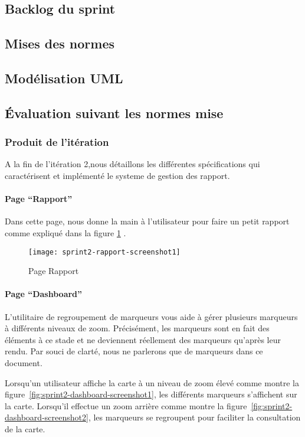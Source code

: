 \subsection{Backlog du sprint}
\subsection{Mises des normes}
\subsection{Modélisation UML}
\subsection{Évaluation suivant les normes mise}
\subsubsection{Produit de l'itération}
A la fin de l'itération 2,nous détaillons les différentes spécifications qui caractérisent et 
implémenté le systeme de gestion des rapport.
\paragraph{Page ``Rapport''}
Dans cette page, nous donne la main à l'utilisateur pour faire un petit rapport comme expliqué dans la
figure \ref{fig:sprint2-rapport-screenshot1} . 
\begin{figure}[htbp]
  \centering
  \texttt{[image: sprint2-rapport-screenshot1]}
  \caption{Page Rapport}
  \label{fig:sprint2-rapport-screenshot1}
\end{figure}
\paragraph{Page ``Dashboard''}
L'utilitaire de regroupement de marqueurs vous aide à gérer plusieurs marqueurs à différents niveaux de zoom.
Précisément, les  marqueurs  sont en fait des éléments à ce stade et ne deviennent réellement des
marqueurs qu'après leur rendu. Par souci de clarté, nous ne parlerons que de marqueurs 
dans ce document.

Lorsqu'un utilisateur affiche la carte à un niveau de zoom élevé comme montre la
figure~\ref{fig:sprint2-dashboard-screenshot1}, les différents marqueurs
s'affichent sur la carte. Lorsqu'il effectue un zoom arrière comme montre la
figure~\ref{fig:sprint2-dashboard-screenshot2}, les marqueurs se regroupent pour faciliter la consultation de la carte.

